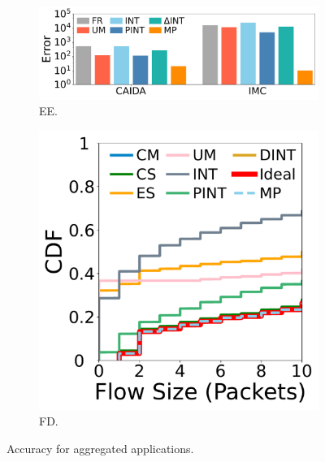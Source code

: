 \begin{figure}[t]
    \centering
    \begin{subfigure}{0.7\linewidth}
    \centering
    \includegraphics[width=\linewidth]{pics/ee.pdf}
    \vspace{-20pt}
    \caption{EE.}
    \end{subfigure}
    \begin{subfigure}{0.28\linewidth}
    \centering
    \includegraphics[width=\linewidth]{pics/cdf-imc.pdf}
    \vspace{-18pt}
    \caption{FD.}
    \end{subfigure}
    \caption{Accuracy for aggregated applications.}
    \vspace{-2pt}
    \label{fig:aggregated-acc}
\end{figure}



